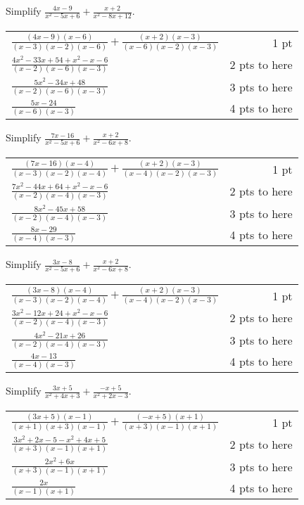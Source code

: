 {
	Simplify $\displaystyle \frac{4x-9}{x^2-5x+6} + \frac{x+2}{x^2-8x+12}$.
}
{
	\begin{tabular}{l r}
	$\frac{(4x-9)(x-6)}{(x-3)(x-2)(x-6)} + \frac{(x+2)(x-3)}{(x-6)(x-2)(x-3)}$ & 1 pt\\
	$\frac{4x^2-33x+54+x^2-x-6}{(x-2)(x-6)(x-3)}$ & 2 pts to here\\
	$\frac{5x^2-34x+48}{(x-2)(x-6)(x-3)}$ & 3 pts to here\\
	$\frac{5x-24}{(x-6)(x-3)}$ & 4 pts to here
	\end{tabular}
}

{
	Simplify $\displaystyle \frac{7x-16}{x^2-5x+6} + \frac{x+2}{x^2-6x+8}$.
}
{
	\begin{tabular}{l r}
	$\frac{(7x-16)(x-4)}{(x-3)(x-2)(x-4)} + \frac{(x+2)(x-3)}{(x-4)(x-2)(x-3)}$ & 1 pt\\
	$\frac{7x^2-44x+64+x^2-x-6}{(x-2)(x-4)(x-3)}$ & 2 pts to here\\
	$\frac{8x^2-45x+58}{(x-2)(x-4)(x-3)}$ & 3 pts to here\\
	$\frac{8x-29}{(x-4)(x-3)}$ & 4 pts to here
	\end{tabular}
}

{
	Simplify $\displaystyle \frac{3x-8}{x^2-5x+6} + \frac{x+2}{x^2-6x+8}$.
}
{
	\begin{tabular}{l r}
	$\frac{(3x-8)(x-4)}{(x-3)(x-2)(x-4)} + \frac{(x+2)(x-3)}{(x-4)(x-2)(x-3)}$ & 1 pt\\
	$\frac{3x^2-12x+24+x^2-x-6}{(x-2)(x-4)(x-3)}$ & 2 pts to here\\
	$\frac{4x^2-21x+26}{(x-2)(x-4)(x-3)}$ & 3 pts to here\\
	$\frac{4x-13}{(x-4)(x-3)}$ & 4 pts to here
	\end{tabular}
}

{
	Simplify $\displaystyle \frac{3x+5}{x^2+4x+3} + \frac{-x+5}{x^2+2x-3}$.
}
{
	\begin{tabular}{l r}
	$\frac{(3x+5)(x-1)}{(x+1)(x+3)(x-1)} + \frac{(-x+5)(x+1)}{(x+3)(x-1)(x+1)}$ & 1 pt\\
	$\frac{3x^2+2x-5-x^2+4x+5}{(x+3)(x-1)(x+1)}$ & 2 pts to here\\
	$\frac{2x^2+6x}{(x+3)(x-1)(x+1)}$ & 3 pts to here\\
	$\frac{2x}{(x-1)(x+1)}$ & 4 pts to here
	\end{tabular}
}
